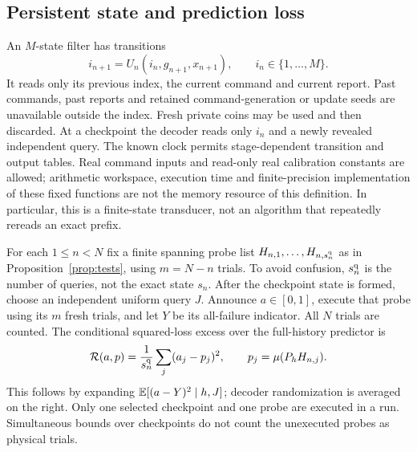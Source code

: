 \subsection{Persistent state and prediction loss}
\begin{definition}\label{def:finite-state}
An $M$-state filter has transitions
\[
 i_{n+1}=U_n(i_n,g_{n+1},x_{n+1}),\qquad i_n\in\{1,\ldots,M\}.
\]
It reads only its previous index, the current command and current report.
Past commands, past reports and retained command-generation or update seeds
are unavailable outside the index. Fresh private coins may be used and
then discarded. At a checkpoint the decoder reads only $i_n$ and a newly
revealed independent query. The known clock permits stage-dependent
transition and output tables. Real command inputs and read-only real
calibration constants are allowed; arithmetic workspace, execution time and
finite-precision implementation of these fixed functions are not the memory
resource of this definition. In particular, this is a finite-state
transducer, not an algorithm that repeatedly rereads an exact prefix.
\end{definition}

For each $1\le n<N$ fix a finite spanning probe list
$H_{n,1},\ldots,H_{n,s_n^{\rm q}}$ as in
Proposition~\ref{prop:tests}, using $m=N-n$ trials. To avoid confusion,
$s_n^{\rm q}$ is the number of queries, not the exact state $s_n$.
After the checkpoint state is formed, choose an independent uniform query
$J$. Announce $a\in[0,1]$, execute that probe using its $m$ fresh trials,
and let $Y$ be its all-failure indicator. All $N$ trials are counted.
The conditional squared-loss excess over the full-history predictor is
\begin{equation}\label{eq:brier}
 \mathcal R(a,p)=\frac1{s_n^{\rm q}}\sum_j(a_j-p_j)^2,
 \qquad p_j=\mu(P_hH_{n,j}).
\end{equation}
This follows by expanding $\mathbb E[(a-Y)^2\mid h,J]$; decoder randomization
is averaged on the right. Only one selected checkpoint and one probe are
executed in a run. Simultaneous bounds over checkpoints do not count the
unexecuted probes as physical trials.

